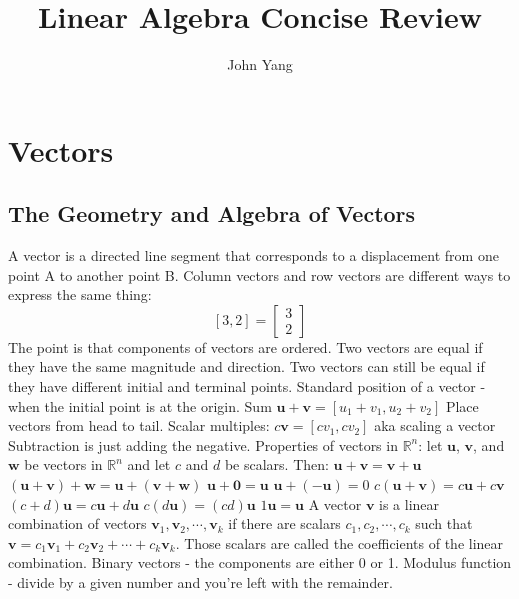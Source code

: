 \documentclass{article}
\title{Linear Algebra Concise Review} %
\author{John Yang}
\begin{document}
    \maketitle
    \tableofcontents
    \section{Vectors} %
        \subsection{The Geometry and Algebra of Vectors}
        \begin{outline}
            \1 A vector is a directed line segment that corresponds to a displacement from one point A to another point B. 
            \1 Column vectors and row vectors are different ways to express the same thing: \[[3,2]=\begin{bmatrix}3 \\ 2\end{bmatrix}\]
            \1 The point is that components of vectors are ordered. 
            \1 Two vectors are equal if they have the same magnitude and direction. Two vectors can still be equal if they have different initial and terminal points. 
            \1 Standard position of a vector - when the initial point is at the origin. 
            \1 Sum \(\mathbf u+\mathbf v=[u_1+v_1,u_2+v_2]\)
            \1 Place vectors from head to tail. 
            \1 Scalar multiples: \(c\mathbf v=[cv_1,cv_2]\) aka scaling a vector
            \1 Subtraction is just adding the negative. 
            \1 Properties of vectors in \(\mathbb{R}^n\): let \(\mathbf u\), \(\mathbf v\), and \(\mathbf w\) be vectors in \(\mathbb{R}^n\) and let $c$ and $d$ be scalars. Then: 
                \2 \(\mathbf u+\mathbf v=\mathbf v+\mathbf u\)
                \2 \((\mathbf u+\mathbf v)+\mathbf w=\mathbf u+(\mathbf v+\mathbf w)\)
                \2 \(\mathbf u+\mathbf 0=\mathbf u\)
                \2 \(\mathbf u+(-\mathbf u)=0\)
                \2 \(c(\mathbf u+\mathbf v)=c\mathbf u+c\mathbf v\)
                \2 \((c+d)\mathbf u=c\mathbf u+d\mathbf u\)
                \2 \(c(d\mathbf u)=(cd)\mathbf u\)
                \2 \(1\mathbf u=\mathbf u\)
            \1 A vector $\mathbf v$ is a linear combination of vectors \(\mathbf v_1,\mathbf v_2,\cdots,\mathbf v_k\) if there are scalars \(c_1,c_2,\cdots,c_k\) such that \(\mathbf v=c_1\mathbf v_1+c_2\mathbf v_2+\cdots+c_k\mathbf v_k\). Those scalars are called the coefficients of the linear combination. 
            \1 Binary vectors - the components are either 0 or 1. 
            \1 Modulus function - divide by a given number and you're left with the remainder. 

        \end{outline}
\end{document}
